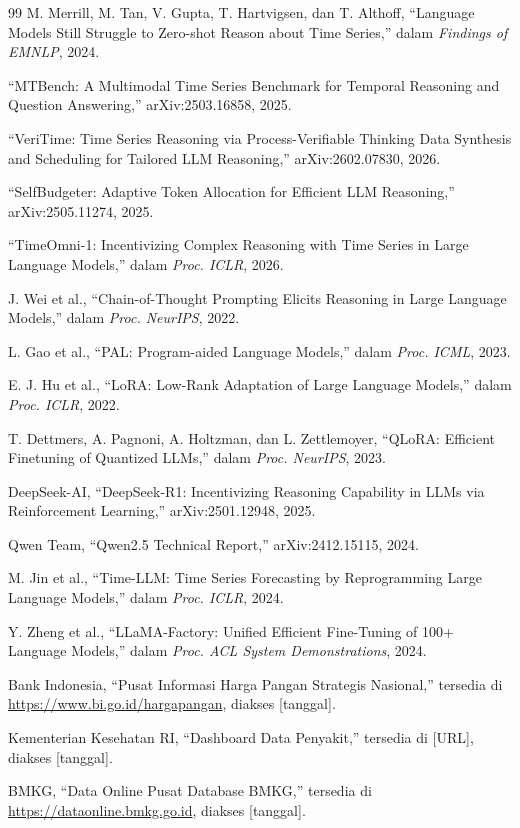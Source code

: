 \documentclass[10pt,a4paper,twocolumn]{article}
\begin{document}
\begin{thebibliography}{99}
\footnotesize
{}
M. Merrill, M. Tan, V. Gupta, T. Hartvigsen, dan T. Althoff, ``Language Models
Still Struggle to Zero-shot Reason about Time Series,'' dalam \textit{Findings
of EMNLP}, 2024.

``MTBench: A Multimodal Time Series Benchmark for Temporal Reasoning and
Question Answering,'' arXiv:2503.16858, 2025.

``VeriTime: Time Series Reasoning via Process-Verifiable Thinking Data Synthesis
and Scheduling for Tailored LLM Reasoning,'' arXiv:2602.07830, 2026.

``SelfBudgeter: Adaptive Token Allocation for Efficient LLM Reasoning,''
arXiv:2505.11274, 2025.

``TimeOmni-1: Incentivizing Complex Reasoning with Time Series in Large Language
Models,'' dalam \textit{Proc. ICLR}, 2026.

J. Wei et al., ``Chain-of-Thought Prompting Elicits Reasoning in Large Language
Models,'' dalam \textit{Proc. NeurIPS}, 2022.

L. Gao et al., ``PAL: Program-aided Language Models,'' dalam \textit{Proc.
ICML}, 2023.

E. J. Hu et al., ``LoRA: Low-Rank Adaptation of Large Language Models,'' dalam
\textit{Proc. ICLR}, 2022.

T. Dettmers, A. Pagnoni, A. Holtzman, dan L. Zettlemoyer, ``QLoRA: Efficient
Finetuning of Quantized LLMs,'' dalam \textit{Proc. NeurIPS}, 2023.

DeepSeek-AI, ``DeepSeek-R1: Incentivizing Reasoning Capability in LLMs via
Reinforcement Learning,'' arXiv:2501.12948, 2025.

Qwen Team, ``Qwen2.5 Technical Report,'' arXiv:2412.15115, 2024.

M. Jin et al., ``Time-LLM: Time Series Forecasting by Reprogramming Large
Language Models,'' dalam \textit{Proc. ICLR}, 2024.

Y. Zheng et al., ``LLaMA-Factory: Unified Efficient Fine-Tuning of 100+ Language
Models,'' dalam \textit{Proc. ACL System Demonstrations}, 2024.

Bank Indonesia, ``Pusat Informasi Harga Pangan Strategis Nasional,'' tersedia di
\url{https://www.bi.go.id/hargapangan}, diakses [tanggal].

Kementerian Kesehatan RI, ``Dashboard Data Penyakit,'' tersedia di [URL],
diakses [tanggal].

BMKG, ``Data Online Pusat Database BMKG,'' tersedia di
\url{https://dataonline.bmkg.go.id}, diakses [tanggal].
\end{thebibliography}
\end{document}
